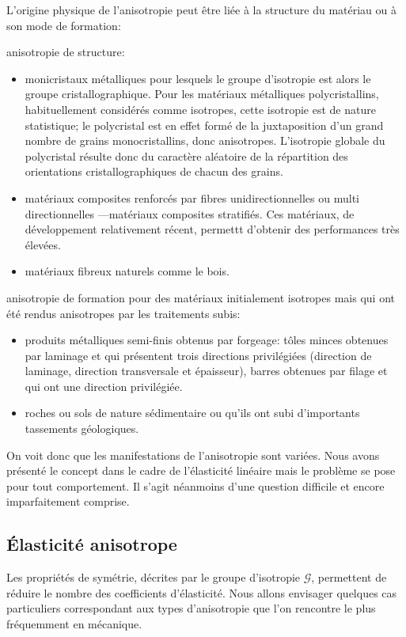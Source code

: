 L'origine physique de l'anisotropie peut être liée à la structure du matériau ou à son mode de formation:
\begin{description}
\item anisotropie de structure:
\begin{itemize}
    \item monicristaux métalliques pour lesquels le groupe d'isotropie est alors le groupe cristallographique.
        Pour les matériaux métalliques polycristallins, habituellement considérés comme isotropes, cette isotropie est de nature statistique; le polycristal est en effet formé de la juxtaposition d'un grand nombre de grains monocristallins, donc anisotropes.
        L'isotropie globale du polycristal résulte donc du caractère aléatoire de la répartition des orientations cristallographiques de chacun des grains.
    \item matériaux composites renforcés par fibres unidirectionnelles ou multi directionnelles ---matériaux composites stratifiés.
        Ces matériaux, de développement relativement récent, permettt d'obtenir des performances très élevées.
    \item matériaux fibreux naturels comme le bois.
\end{itemize}
\item anisotropie de formation pour des matériaux initialement isotropes mais qui ont été rendus anisotropes par les traitements subis:
\begin{itemize}
    \item produits métalliques semi-finis obtenus par forgeage: tôles minces obtenues par laminage et qui présentent trois directions privilégiées (direction de laminage, direction transversale et épaisseur), barres obtenues par filage et qui ont une direction privilégiée.
    \item roches ou sols de nature sédimentaire ou qu'ils ont subi d'importants 
tassements géologiques.
\end{itemize}
\end{description}
On voit donc que les manifestations de l'anisotropie sont variées.
Nous avons présenté le concept dans le cadre de l'élasticité linéaire mais le problème se pose pour tout comportement.
Il s'agit néanmoins d'une question difficile et encore imparfaitement comprise. 

\subsection{Élasticité anisotrope} \label{ssec:Ch05-1.3}
Les propriétés de symétrie, décrites par le groupe d'isotropie $\mathcal{G}$, permettent de réduire le nombre des coefficients d'élasticité.
Nous allons envisager quelques cas particuliers correspondant aux types d'anisotropie que l'on rencontre le plus fréquemment en mécanique. 
